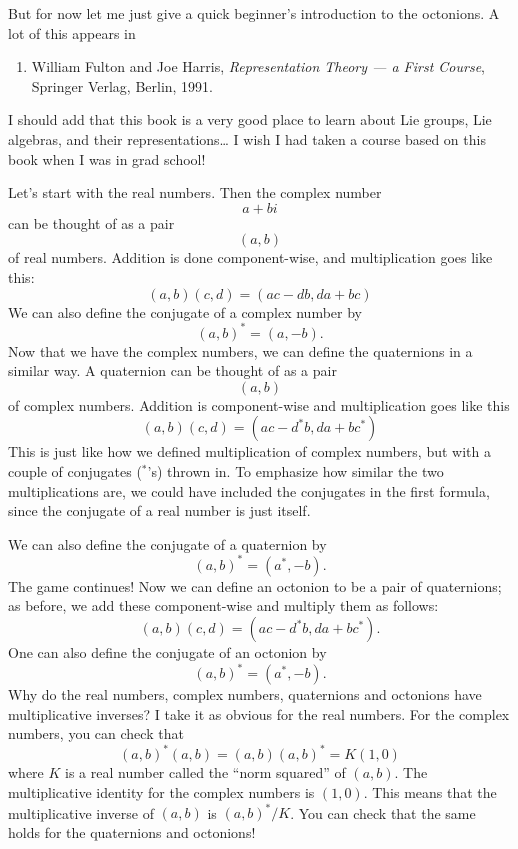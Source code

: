 \documentclass{article}
\def\tightlist{}
\begin{document}
But for now let me just give a quick beginner's introduction to the
octonions. A lot of this appears in

\begin{enumerate}
\def\labelenumi{\arabic{enumi})}
\setcounter{enumi}{1}
\tightlist
\item
  William Fulton and Joe Harris, \emph{Representation Theory --- a First
  Course}, Springer Verlag, Berlin, 1991.
\end{enumerate}

I should add that this book is a very good place to learn about Lie
groups, Lie algebras, and their representations\ldots{} I wish I had
taken a course based on this book when I was in grad school!

Let's start with the real numbers. Then the complex number \[a+bi\] can
be thought of as a pair \[(a,b)\] of real numbers. Addition is done
component-wise, and multiplication goes like this:
\[(a,b)(c,d) = (ac - db,da + bc)\] We can also define the conjugate of a
complex number by \[(a,b)^* = (a,-b).\] Now that we have the complex
numbers, we can define the quaternions in a similar way. A quaternion
can be thought of as a pair \[(a,b)\] of complex numbers. Addition is
component-wise and multiplication goes like this
\[(a,b)(c,d) = (ac - d^*b, da + bc^*)\] This is just like how we defined
multiplication of complex numbers, but with a couple of conjugates
(\({}^*\)'s) thrown in. To emphasize how similar the two multiplications
are, we could have included the conjugates in the first formula, since
the conjugate of a real number is just itself.

We can also define the conjugate of a quaternion by
\[(a,b)^* = (a^*,-b).\] The game continues! Now we can define an
octonion to be a pair of quaternions; as before, we add these
component-wise and multiply them as follows:
\[(a,b)(c,d) = (ac - d^*b, da + bc^*).\] One can also define the
conjugate of an octonion by \[(a,b)^* = (a^*,-b).\] Why do the real
numbers, complex numbers, quaternions and octonions have multiplicative
inverses? I take it as obvious for the real numbers. For the complex
numbers, you can check that \[(a,b)^* (a,b) = (a,b) (a,b)^* = K (1,0)\]
where \(K\) is a real number called the ``norm squared'' of \((a,b)\).
The multiplicative identity for the complex numbers is \((1,0)\). This
means that the multiplicative inverse of \((a,b)\) is \((a,b)^*/K\). You
can check that the same holds for the quaternions and octonions!
\end{document}
